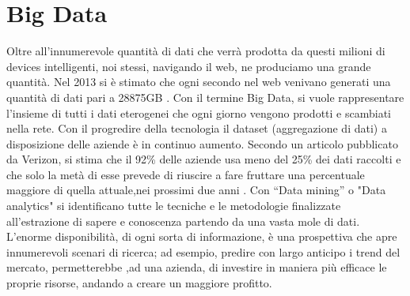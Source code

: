 \section{Big Data}
Oltre all'innumerevole quantità di dati che verrà prodotta da questi milioni di
devices intelligenti, noi stessi,  navigando il web, ne produciamo una grande
quantità. Nel 2013\bx{,} si è stimato che ogni secondo nel web venivano generati una
quantità di dati pari a 28875GB . Con il  termine Big Data, si vuole
rappresentare l'insieme di tutti i dati eterogenei\bx{,} che ogni giorno vengono
prodotti e scambiati nella rete.
Con il progredire della tecnologia il dataset (aggregazione di dati) a
disposizione delle aziende è in continuo aumento.
Secondo un articolo pubblicato da Verizon, si stima che il 92\% delle aziende
usa meno del 25\% dei dati raccolti e che solo la metà  di esse prevede di
riuscire a fare fruttare una percentuale maggiore di quella attuale,nei prossimi due anni
\cite{Verizon}.  Con “Data mining” o "Data analytics"  si identificano tutte le
tecniche e le metodologie finalizzate all’estrazione di sapere e conoscenza
partendo da una vasta mole di dati.
L’enorme disponibilità, di ogni sorta di informazione, è una prospettiva che 
apre innumerevoli scenari di ricerca; ad esempio, predire con largo anticipo i 
trend del mercato, permetterebbe ,ad una azienda, di investire in maniera più
efficace le proprie risorse, andando a creare un maggiore profitto.


